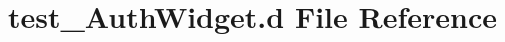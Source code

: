\hypertarget{test___auth_widget_8d}{}\section{test\+\_\+\+Auth\+Widget.\+d File Reference}
\label{test___auth_widget_8d}
